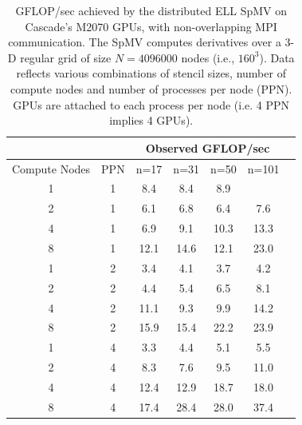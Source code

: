 \begin{table}[h]
\centering
\caption{GFLOP/sec achieved by the distributed ELL SpMV on Cascade's M2070 GPUs, with non-overlapping MPI communication. The SpMV computes derivatives over a 3-D regular grid of size $N=4096000$ nodes (i.e., $160^3$). Data reflects various combinations of stencil sizes, number of compute nodes and number of processes per node (PPN). GPUs are attached to each process per node (i.e. 4 PPN implies 4 GPUs). }
\label{tbl:cascade_m2070_nonoverlap}
\begin{tabular}{c|c|c|c|c|c|c}
 \multicolumn{2}{c}{ } & \multicolumn{4}{|c|}{Observed GFLOP/sec} \\  \hline
Compute Nodes   &   PPN  &   n=17   &   n=31   &   n=50   &   n=101   \\ \hline
1  &  1  &  8.4  &  8.4  &  8.9  &   \\
2  &  1  &  6.1  &  6.8  &  6.4  &  7.6 \\
4  &  1  &  6.9  &  9.1  &  10.3  &  13.3 \\
8  &  1  &  12.1  &  14.6  &  12.1  &  23.0 \\ \hline
1  &  2  &  3.4  &  4.1  &  3.7  &  4.2 \\
2  &  2  &  4.4  &  5.4  &  6.5  &  8.1 \\
4  &  2  &  11.1  &  9.3  &  9.9  &  14.2 \\
8  &  2  &  15.9  &  15.4  &  22.2  &  23.9 \\ \hline
1  &  4  &  3.3  &  4.4  &  5.1  &  5.5 \\
2  &  4  &  8.3  &  7.6  &  9.5  &  11.0 \\
4  &  4  &  12.4  &  12.9  &  18.7  &  18.0 \\
8  &  4  &  17.4  &  28.4  &  28.0  &  37.4 
\end{tabular} 
\end{table}



